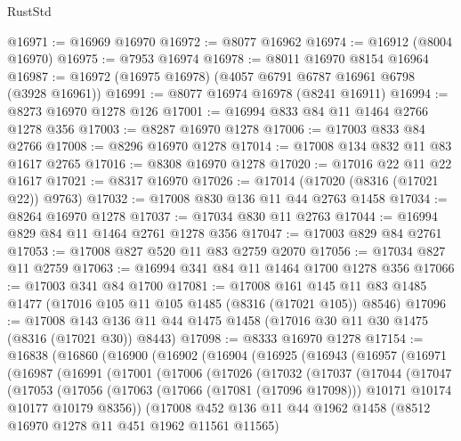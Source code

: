 \begin{lexlean}{RustStd}
\begin{coremodule}
@16971 := @16969 @16970
@16972 := @8077 @16962
@16974 := @16912 (@8004 @16970)
@16975 := @7953 @16974
@16978 := @8011 @16970 @8154 @16964
@16987 := @16972 (@16975 @16978) (@4057 @6791 @6787 @16961 @6798 (@3928 @16961))
@16991 := @8077 @16974 @16978 (@8241 @16911)
@16994 := @8273 @16970 @1278 @126
@17001 := @16994 @833 @84 @11 @1464 @2766 @1278 @356
@17003 := @8287 @16970 @1278
@17006 := @17003 @833 @84 @2766
@17008 := @8296 @16970 @1278
@17014 := @17008 @134 @832 @11 @83 @1617 @2765
@17016 := @8308 @16970 @1278
@17020 := @17016 @22 @11 @22 @1617
@17021 := @8317 @16970
@17026 := @17014 (@17020 (@8316 (@17021 @22)) @9763)
@17032 := @17008 @830 @136 @11 @44 @2763 @1458
@17034 := @8264 @16970 @1278
@17037 := @17034 @830 @11 @2763
@17044 := @16994 @829 @84 @11 @1464 @2761 @1278 @356
@17047 := @17003 @829 @84 @2761
@17053 := @17008 @827 @520 @11 @83 @2759 @2070
@17056 := @17034 @827 @11 @2759
@17063 := @16994 @341 @84 @11 @1464 @1700 @1278 @356
@17066 := @17003 @341 @84 @1700
@17081 := @17008
    @161
    @145
    @11
    @83
    @1485
    @1477
    (@17016 @105 @11 @105 @1485 (@8316 (@17021 @105)) @8546)
@17096 := @17008 @143 @136 @11 @44 @1475 @1458 (@17016 @30 @11 @30 @1475 (@8316 (@17021 @30)) @8443)
@17098 := @8333 @16970 @1278
@17154 := @16838
    (@16860
      (@16900
        (@16902
          (@16904
            (@16925
              (@16943
                (@16957
                  (@16971
                    (@16987
                      (@16991
                        (@17001
                          (@17006
                            (@17026
                              (@17032
                                (@17037
                                  (@17044
                                    (@17047
                                      (@17053
                                        (@17056
                                          (@17063
                                            (@17066 (@17081 (@17096 @17098)))
                                            @10171
                                            @10174
                                            @10177
                                            @10179
                                            @8356))
                                        (@17008
                                          @452
                                          @136
                                          @11
                                          @44
                                          @1962
                                          @1458
                                          (@8512 @16970 @1278 @11 @451 @1962 @11561 @11565)

\end{coremodule}
\end{lexlean}
